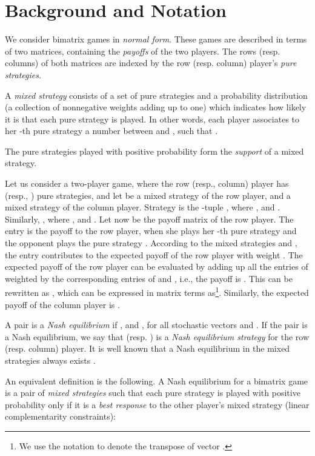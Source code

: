 \documentclass[11pt]{article}
\begin{document}
\section{Background and Notation}

We consider bimatrix games in {\em normal form}. These games are
described in terms of two matrices, containing the {\em payoffs} of
the two players. The rows (resp. columns) of both matrices are
indexed by the row (resp. column) player's {\em pure strategies}.

A {\em mixed strategy} consists of a set of pure strategies and a
probability distribution (a collection of nonnegative weights adding
up to one) which indicates how likely it is that each pure strategy
is played. In other words, each player associates to her -th pure
strategy a number  between  and , such that .

The pure strategies played with positive probability form the {\em
support} of a mixed strategy.

Let us consider a two-player game, where the row (resp., column)
player has  (resp., ) pure strategies, and let  be a mixed
strategy of the row player, and  a mixed strategy of the column
player. Strategy  is the -tuple ,
where , and . Similarly, , where , and . Let now  be the payoff matrix of the row player. The
entry  is the payoff to the row player, when she plays her
-th pure strategy and the opponent plays the pure strategy .
According to the mixed strategies  and , the entry 
contributes to the expected payoff of the row player with weight
. The expected payoff of the row player can be evaluated by
adding up all the entries of  weighted by the corresponding
entries of  and , i.e., the payoff is . This can be rewritten as
 , which can be expressed in matrix
terms as\footnote{We
 use the notation  to denote the transpose of
vector .}. Similarly, the expected payoff of the column
player is .

A pair  is a {\em Nash equilibrium} if , and , for all stochastic vectors 
and . If the pair  is a Nash equilibrium, we say that
 (resp. ) is a {\em Nash equilibrium strategy} for the row
(resp. column) player. It is well known that a Nash equilibrium in
the mixed strategies always exists \cite{nash}.

An equivalent definition is the following. A Nash equilibrium for a
bimatrix game  is a pair of {\em mixed strategies} 
such that each pure strategy is played with positive probability
only if it is a {\em best response} to the other player's mixed
strategy (linear complementarity constraints):
\end{document}
